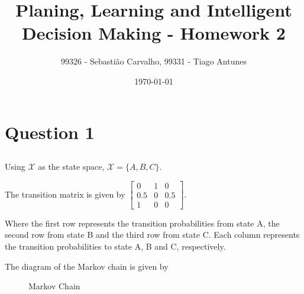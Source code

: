 \documentclass{article}
\title{Planing, Learning and Intelligent Decision Making - Homework 2}
\author{99326 - Sebastião Carvalho, 99331 - Tiago Antunes}
\date{\today}
\begin{document}
\maketitle

\tableofcontents

\section{Question 1}

\subsection{}

Using $\mathcal{X}$ as the state space, $\mathcal{X} = \{ A, B, C\}$.

\bigskip

The transition matrix is given by
$
\begin{bmatrix}
    0 & 1 & 0 \\
    0.5 & 0 & 0.5 \\
    1 & 0 & 0
\end{bmatrix}
$.

\bigskip

Where the first row represents the transition probabilities from state A, the second row from state B and the third row from state C.
Each column represents the transition probabilities to state A, B and C, respectively.

\bigskip

The diagram of the Markov chain is given by

\begin{figure}
    \centering
    \caption{Markov Chain}
    \label{fig: markov_chain}
\end{figure}


\subsection{}
\end{document}
